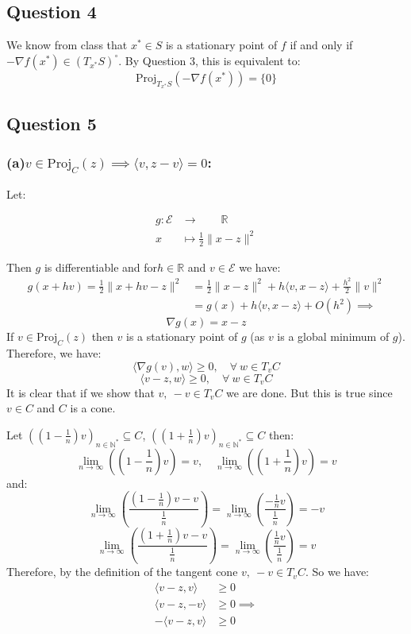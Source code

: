 \documentclass[12p]{article}
\newcommand*{\proj}{\text{Proj}}
\newcommand*{\es}{\mathcal{E}}
\begin{document}
\subsection*{Question 4} \hfil\par
We know from class that \(x^*\in S\) is a stationary point of \(f\) if and only if \(-\nabla f(x^*)\in (T_{x^*}S)^\circ\). By Question 3, this is equivalent to:
 \[\text{Proj}_{T_{x^*}S}(-\nabla f(x^*))=\{0\}\]
\pagebreak
\subsection*{Question 5}\hfil\par 
\subsubsection*{(a)\quad \(v\in \proj_C(z)\implies \langle v, z-v\rangle = 0\):}\hfil\par
Let:

\begin{align*}
    g: \es &\to \quad \quad \mathbb{R}\\
    x &\mapsto \frac{1}{2}\|x-z\|^2
\end{align*} 
    
Then \(g\) is differentiable and for\(h\in \mathbb{R}\) and \(v\in\es\) we have:
\begin{align*}
g(x+hv)=\frac{1}{2}\|x+hv-z\|^2&=\frac{1}{2}\|x-z\|^2+h\langle v, x-z\rangle+\frac{h^2}{2}\|v\|^2\\
&=g(x)+h\langle v, x-z\rangle+O(h^2)\implies         
\end{align*}
\[
  \nabla g(x)= x-z 
\]
If \(v\in \proj_C(z)\) then \(v\) is a stationary point of \(g\) (as \(v\) is a global minimum of \(g\)). Therefore, we have: 
\[
  \langle \nabla g(v), w\rangle \geq 0, \quad  \forall\ w\in T_vC
\]
\[
  \langle v-z, w\rangle \geq 0, \quad  \forall\ w\in T_vC   
\]
It is clear that if we show that \(v,\ -v \in T_vC\) we are done. But this is true since \(v\in C\) and \(C\) is a cone.

Let \(\left((1-\frac{1}{n})v\right)_{n\in \mathbb{N}^*}\subseteq C\), \(\left((1+\frac{1}{n})v\right)_{n\in \mathbb{N}^*}\subseteq C\) then: 
\[
  \lim_{n\to \infty}\left((1-\frac{1}{n})v\right)=v,\quad \lim_{n\to \infty}\left((1+\frac{1}{n})v\right)=v 
\]
and:
\[
  \lim_{n\to \infty}\left(\frac{(1-\frac{1}{n})v-v}{\frac{1}{n}}\right)=\lim_{n\to \infty}\left(\frac{-\frac{1}{n}v}{\frac{1}{n}}\right)=-v 
\]
\[
    \lim_{n\to \infty}\left(\frac{(1+\frac{1}{n})v-v}{\frac{1}{n}}\right)=\lim_{n\to \infty}\left(\frac{\frac{1}{n}v}{\frac{1}{n}}\right)=v 
\]
Therefore, by the definition of the tangent cone \(v,\ -v \in T_vC\). So we have:
\begin{align*}
    \langle v-z, v\rangle &\geq 0\\
    \langle v-z, -v\rangle &\geq 0 \implies \\
    -\langle v-z, v\rangle &\geq 0
\end{align*}
\end{document}
